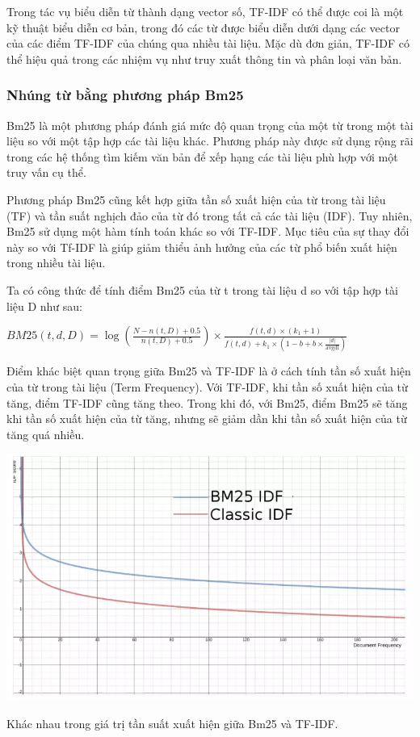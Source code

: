 \documentclass[a4paper, 12pt, openany]{book}
\begin{document}
Trong tác vụ biểu diễn từ thành dạng vector số, TF-IDF có thể được coi là một kỹ thuật biểu diễn cơ bản, trong đó các từ được biểu diễn dưới dạng các vector của các điểm TF-IDF của chúng qua nhiều tài liệu. Mặc dù đơn giản, TF-IDF có thể hiệu quả trong các nhiệm vụ như truy xuất thông tin và phân loại văn bản.

\subsubsection{Nhúng từ bằng phương pháp Bm25}

Bm25 là một phương pháp đánh giá mức độ quan trọng của một từ trong một tài liệu so với một tập hợp các tài liệu khác. Phương pháp này được sử dụng rộng rãi trong các hệ thống tìm kiếm văn bản để xếp hạng các tài liệu phù hợp với một truy vấn cụ thể.

Phương pháp Bm25 cũng kết hợp giữa tần số xuất hiện của từ trong tài liệu (TF) và tần suất nghịch đảo của từ đó trong tất cả các tài liệu (IDF). Tuy nhiên, Bm25 sử dụng một hàm tính toán khác so với TF-IDF.
Mục tiêu của sự thay đổi này so với Tf-IDF là giúp giảm thiểu ảnh hưởng của các từ phổ biến xuất hiện trong nhiều tài liệu.

Ta có công thức để tính điểm Bm25 của từ t trong tài liệu d so với tập hợp tài liệu D như sau:

\begin{center}
    \(BM25(t, d, D) = \log \left( \frac{N - n(t, D) + 0.5}{n(t, D) + 0.5} \right) \times \frac{f(t, d) \times (k_1 + 1)}{f(t, d) + k_1 \times (1 - b + b \times \frac{|d|}{\text{avgdl}})}\)
\end{center}

Điểm khác biệt quan trọng giữa Bm25 và TF-IDF là ở cách tính tần số xuất hiện của từ trong tài liệu (Term Frequency).
Với TF-IDF, khi tần số xuất hiện của từ tăng, điểm TF-IDF cũng tăng theo. Trong khi đó, với Bm25, điểm Bm25 sẽ tăng khi tần số xuất hiện của từ tăng, nhưng sẽ giảm dần khi tần số xuất hiện của từ tăng quá nhiều.

\begin{minipage}{\linewidth}
    \captionsetup{type=figure}
    \centering
    \includegraphics[width=\linewidth]{./assets/images/bm25.png}
    \caption{Khác nhau trong giá trị tần suất xuất hiện giữa Bm25 và TF-IDF.}
\end{minipage}
\end{document}
